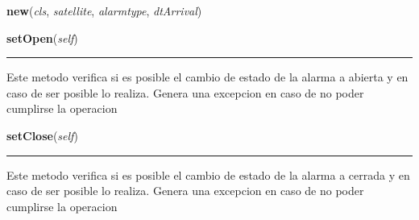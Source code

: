     \label{GroundSegment:models:Alarm:Alarm:Alarm:new}

    \vspace{0.5ex}

\hspace{.8\funcindent}\begin{boxedminipage}{\funcwidth}

    \raggedright \textbf{new}(\textit{cls}, \textit{satellite}, \textit{alarmtype}, \textit{dtArrival})

\setlength{\parskip}{2ex}
\setlength{\parskip}{1ex}
    \end{boxedminipage}

    \label{GroundSegment:models:Alarm:Alarm:Alarm:setOpen}

    \vspace{0.5ex}

\hspace{.8\funcindent}\begin{boxedminipage}{\funcwidth}

    \raggedright \textbf{setOpen}(\textit{self})

    \vspace{-1.5ex}

    \rule{\textwidth}{0.5\fboxrule}
\setlength{\parskip}{2ex}
    Este metodo verifica si es posible el cambio de estado de la alarma a 
    abierta y en caso de ser posible lo realiza. Genera una excepcion en 
    caso de no poder cumplirse la operacion

\setlength{\parskip}{1ex}
    \end{boxedminipage}

    \label{GroundSegment:models:Alarm:Alarm:Alarm:setClose}

    \vspace{0.5ex}

\hspace{.8\funcindent}\begin{boxedminipage}{\funcwidth}

    \raggedright \textbf{setClose}(\textit{self})

    \vspace{-1.5ex}

    \rule{\textwidth}{0.5\fboxrule}
\setlength{\parskip}{2ex}
    Este metodo verifica si es posible el cambio de estado de la alarma a 
    cerrada y en caso de ser posible lo realiza. Genera una excepcion en 
    caso de no poder cumplirse la operacion

\setlength{\parskip}{1ex}
    \end{boxedminipage}

